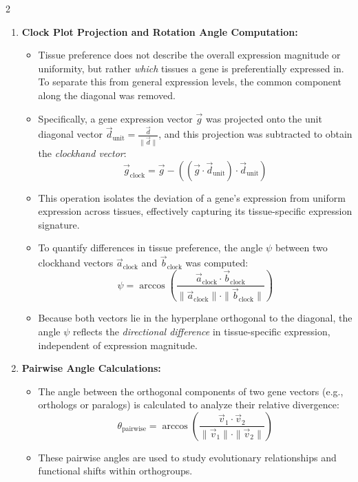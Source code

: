 2\documentclass{article}
\begin{document}
\begin{enumerate}
    \item \textbf{Clock Plot Projection and Rotation Angle Computation:}
\begin{itemize}
    \item Tissue preference does not describe the overall expression magnitude or uniformity, but rather \emph{which} tissues a gene is preferentially expressed in. To separate this from general expression levels, the common component along the diagonal was removed.
    \item Specifically, a gene expression vector \( \vec{g} \) was projected onto the unit diagonal vector \( \vec{d}_{\text{unit}} = \frac{\vec{d}}{\|\vec{d}\|} \), and this projection was subtracted to obtain the \textit{clockhand vector}:
    \[
    \vec{g}_{\text{clock}} = \vec{g} - \left( (\vec{g} \cdot \vec{d}_{\text{unit}}) \cdot \vec{d}_{\text{unit}} \right)
    \]
    \item This operation isolates the deviation of a gene’s expression from uniform expression across tissues, effectively capturing its tissue-specific expression signature.
    \item To quantify differences in tissue preference, the angle \( \psi \) between two clockhand vectors \( \vec{a}_{\text{clock}} \) and \( \vec{b}_{\text{clock}} \) was computed:
    \[
    \psi = \arccos \left( \frac{ \vec{a}_{\text{clock}} \cdot \vec{b}_{\text{clock}} }{ \|\vec{a}_{\text{clock}}\| \cdot \|\vec{b}_{\text{clock}}\| } \right)
    \]
    \item Because both vectors lie in the hyperplane orthogonal to the diagonal, the angle \( \psi \) reflects the \emph{directional difference} in tissue-specific expression, independent of expression magnitude.
\end{itemize}


    \item \textbf{Pairwise Angle Calculations:}
    \begin{itemize}
        \item The angle between the orthogonal components of two gene vectors (e.g., orthologs or paralogs) is calculated to analyze their relative divergence:
        \[
        \theta_{\text{pairwise}} = \arccos\left(\frac{\vec{v}_1 \cdot \vec{v}_2}{\|\vec{v}_1\| \cdot \|\vec{v}_2\|}\right)
        \]
        \item These pairwise angles are used to study evolutionary relationships and functional shifts within orthogroups.
    \end{itemize}


\end{enumerate}
\end{document}
